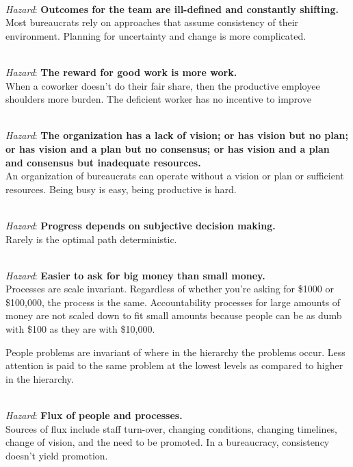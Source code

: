 \ \\
\textit{Hazard}: \textbf{Outcomes for the team are ill-defined and constantly shifting.}\\
Most bureaucrats rely on approaches that assume consistency of their environment. Planning for uncertainty and change is more complicated.

\ \\
\textit{Hazard}: \textbf{The reward for good work is more work.}\\
When a coworker doesn't do their fair share, then the productive employee shoulders more burden. The deficient worker has no incentive to improve

\ \\
\textit{Hazard}: \textbf{The organization has a lack of vision; or has vision but no plan; or has vision and a plan but no consensus; or has vision and a plan and consensus but inadequate resources.}\\
An organization of bureaucrats can operate without a vision or plan or sufficient resources. Being busy is easy, being productive is hard.

\ \\
\textit{Hazard}: \textbf{Progress depends on subjective decision making.}\\
Rarely is the optimal path deterministic. 

\ \\
\textit{Hazard}: \textbf{Easier to ask for big money than small money.}\\
Processes are scale invariant. Regardless of whether you're asking for \$1000 or \$100,000, the process is the same. Accountability processes for large amounts of money are not scaled down to fit small amounts because people can be as dumb with \$100 as they are with \$10,000.


People problems are invariant of where in the hierarchy the problems occur. Less attention is paid to the same problem at the lowest levels as compared to higher in the hierarchy.


\ \\
\textit{Hazard}: \textbf{Flux of people and processes.} \\
Sources of flux include staff turn-over, changing conditions, changing timelines, change of vision, and the need to be promoted. In a bureaucracy, consistency doesn't yield promotion.

